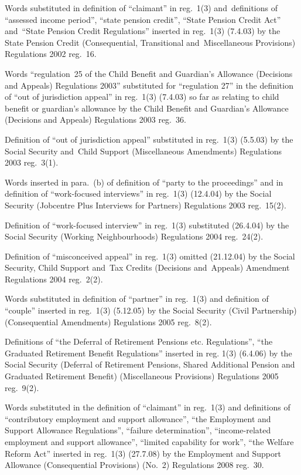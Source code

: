 \documentclass[12pt,a4paper]{article}
\begin{document}
{Words substituted in definition of ``claimant'' in reg.~1(3) and~definitions of ``assessed income period'', ``state pension credit'', ``State Pension Credit Act'' and~``State Pension Credit Regulations'' inserted in reg.~1(3) (7.4.03) by the State Pension Credit (Consequential, Transitional and~Miscellaneous Provisions) Regulations 2002 reg.~16.

Words ``regulation~25 of the Child Benefit and Guardian's Allowance (Decisions and Appeals) Regulations 2003'' substituted for ``regulation 27'' in the definition of ``out of jurisdiction appeal'' in reg.~1(3) (7.4.03) so far as relating to child benefit or guardian's allowance by the Child Benefit and Guardian’s Allowance (Decisions and Appeals) Regulations 2003 reg.~36.

Definition of ``out of jurisdiction appeal'' substituted in reg.~1(3) (5.5.03) by the Social Security and~Child Support (Miscellaneous Amendments) Regulations 2003 reg.~3(1).

Words inserted in para.~(b) of definition of ``party to the proceedings'' and in definition of ``work-focused interviews'' in reg.~1(3) (12.4.04) by the Social Security (Jobcentre Plus Interviews for Partners) Regulations 2003 reg.~15(2).

Definition of ``work-focused interview'' in reg.~1(3) substituted (26.4.04) by the Social Security (Working Neighbourhoods) Regulations 2004 reg.~24(2).

Definition of ``misconceived appeal'' in reg.~1(3) omitted (21.12.04) by the Social Security, Child Support and~Tax Credits (Decisions and~Appeals) Amendment Regulations 2004 reg.~2(2).

Words substituted in definition of ``partner'' in reg.~1(3) and definition of ``couple'' inserted in reg.~1(3) (5.12.05) by the Social Security (Civil Partnership) (Consequential Amendments) Regulations 2005 reg.~8(2).

Definitions of ``the Deferral of Retirement Pensions etc. Regulations'', ``the Graduated Retirement Benefit Regulations'' inserted in reg. 1(3) (6.4.06) by the Social Security (Deferral of Retirement Pensions, Shared Additional Pension and Graduated Retirement Benefit) (Miscellaneous Provisions) Regulations 2005 reg.~9(2).

Words substituted in the definition of ``claimant'' in reg.~1(3) and definitions of ``contributory employment and support allowance'', ``the Employment and Support Allowance Regulations'', ``failure determination'', ``income-related employment and support allowance'', ``limited capability for work'', ``the Welfare Reform Act'' inserted in reg.~1(3) (27.7.08) by the Employment and Support Allowance (Consequential Provisions) (No.~2) Regulations 2008 reg.~30.

}
\end{document}

